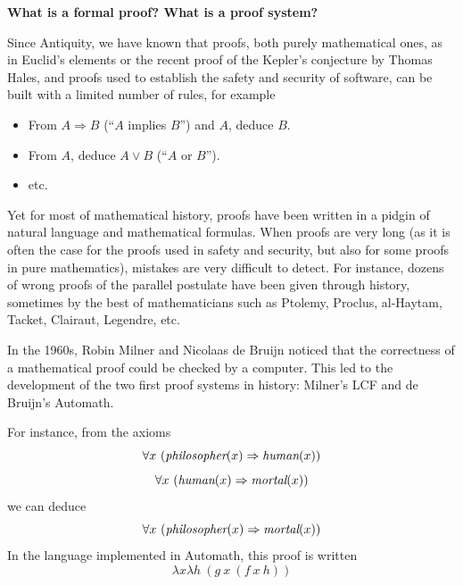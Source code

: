 \begin{framed}
  \vspace*{-0.5cm}
  \begin{center}
    {\bf \Large What is a formal proof? What is a proof system?}
    \end{center}

Since Antiquity, we have known that
proofs, both purely mathematical ones, as in Euclid's elements or the
recent proof of the Kepler's conjecture by Thomas Hales, and proofs used
to establish the safety and security of software, can be built with a
limited number of rules, for example
\begin{itemize}
\item From $A\Rightarrow B$ (``$A$ implies $B$'') and $A$, deduce $B$.
\item From $A$, deduce $A\vee B$ (``$A$ or $B$'').
\item etc.
\end{itemize}
Yet for most of mathematical history, proofs have been written in
a pidgin of natural language and mathematical formulas. When proofs are
very long (as it is often the case for the proofs used in safety and security,
but also for some proofs in pure mathematics), mistakes are
very difficult to detect. For instance, dozens of wrong proofs of
the parallel postulate have been given through history, sometimes by the
best of mathematicians such as Ptolemy, Proclus, al-Haytam, Tacket,
Clairaut, Legendre, etc.

In the 1960s, Robin Milner and Nicolaas de Bruijn noticed that the
correctness of a mathematical proof could be checked by a
computer. This led to the development of the two first proof systems
in history: Milner's LCF and de Bruijn's Automath.

For instance, from the axioms
$$\forall x~(\mbox{\em philosopher}(x) \Rightarrow \mbox{\em human}(x))$$
$$\forall x~(\mbox{\em human}(x) \Rightarrow \mbox{\em mortal}(x))$$
we can deduce
$$\forall x~(\mbox{\em philosopher}(x) \Rightarrow \mbox{\em mortal}(x))$$
In the language implemented in Automath, this proof is written
$$\lambda x \lambda h~(g~x~(f~x~h))$$
\end{framed}

